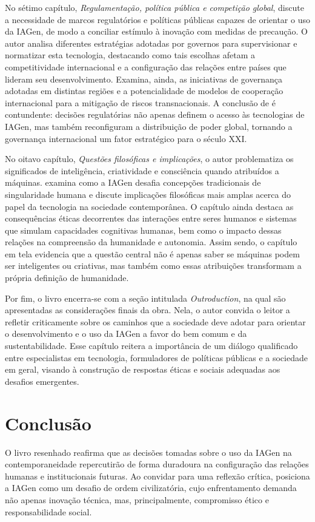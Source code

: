 \documentclass[portuguese]{textolivre}
\begin{document}
No sétimo capítulo, \textit{Regulamentação, política pública e competição global}, \textcite{kaplan2024generative} discute a necessidade de marcos regulatórios e políticas públicas capazes de orientar o uso da IAGen, de modo a conciliar estímulo à inovação com medidas de precaução. O autor analisa diferentes estratégias adotadas por governos para supervisionar e normatizar esta tecnologia, destacando como tais escolhas afetam a competitividade internacional e a configuração das relações entre países que lideram seu desenvolvimento. Examina, ainda, as iniciativas de governança adotadas em distintas regiões e a potencialidade de modelos de cooperação internacional para a mitigação de riscos transnacionais. A conclusão de \textcite{kaplan2024generative} é contundente: decisões regulatórias não apenas definem o acesso às tecnologias de IAGen, mas também reconfiguram a distribuição de poder global, tornando a governança internacional um fator estratégico para o século XXI.

No oitavo capítulo, \textit{Questões filosóficas e implicações}, o autor problematiza os significados de inteligência, criatividade e consciência quando atribuídos a máquinas. \textcite{kaplan2024generative} examina como a IAGen desafia concepções tradicionais de singularidade humana e discute implicações filosóficas mais amplas acerca do papel da tecnologia na sociedade contemporânea. O capítulo ainda destaca as consequências éticas decorrentes das interações entre seres humanos e sistemas que simulam capacidades cognitivas humanas, bem como o impacto dessas relações na compreensão da humanidade e autonomia. Assim sendo, o capítulo em tela evidencia que a questão central não é apenas saber se máquinas podem ser inteligentes ou criativas, mas também como essas atribuições transformam a própria definição de humanidade.

Por fim, o livro encerra-se com a seção intitulada \textit{Outroduction}, na qual são apresentadas as considerações finais da obra. Nela, o autor convida o leitor a refletir criticamente sobre os caminhos que a sociedade deve adotar para orientar o desenvolvimento e o uso da IAGen a favor do bem comum e da sustentabilidade. Esse capítulo reitera a importância de um diálogo qualificado entre especialistas em tecnologia, formuladores de políticas públicas e a sociedade em geral, visando à construção de respostas éticas e sociais adequadas aos desafios emergentes.

\section{Conclusão}\label{sec-conduta}
O livro resenhado  reafirma que as decisões tomadas sobre o uso da IAGen na contemporaneidade repercutirão de forma duradoura na configuração das relações humanas e institucionais futuras. Ao convidar para uma reflexão crítica, \textcite{kaplan2024generative} posiciona a IAGen como um desafio de ordem civilizatória, cujo enfrentamento demanda não apenas inovação técnica, mas, principalmente, compromisso ético e responsabilidade social.
\end{document}
